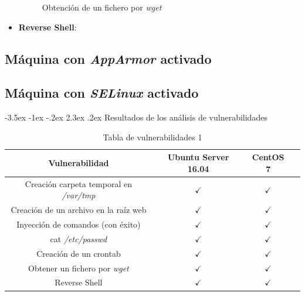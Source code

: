 \documentclass[11pt]{report}
\makeatletter
\renewcommand\chapter{\@startsection{chapter}{0}{\z@}%
    {-3.5ex \@plus -1ex \@minus -.2ex}%
    {2.3ex \@plus.2ex}%
    {\normalfont\Large\bfseries}}
\makeatother
\begin{document}
\begin{itemize}
\begin{figure}[H]
          \caption{Obtención de un fichero por \emph{wget}}
        \end{figure}
  \item \textbf{Reverse Shell}:
\end{itemize}
\subsection{Máquina con \emph{AppArmor} activado}
\subsection{Máquina con \emph{SELinux} activado}

\chapter{Resultados de los análisis de vulnerabilidades}
\begin{table}[H]
  \centering
  \begin{tabular}{|c|c|c|c|}
    \hline
    \textbf{Vulnerabilidad}                      & \textbf{Ubuntu Server 16.04} & \textbf{CentOS 7} \\ \hline
    Creación carpeta temporal en \emph{/var/tmp} & $\checkmark$                 & $\checkmark$      \\ \hline
    Creación de un archivo en la raíz web        & $\checkmark$                 & $\checkmark$      \\ \hline
    Inyección de comandos (con éxito)            & $\checkmark$                 & $\checkmark$      \\ \hline
    cat \emph{/etc/passwd}                       & $\checkmark$                 & $\checkmark$      \\ \hline
    Creación de un crontab                       & $\checkmark$                 & $\checkmark$      \\ \hline
    Obtener un fichero por \emph{wget}           & $\checkmark$                 & $\checkmark$      \\ \hline
    Reverse Shell                                & $\checkmark$                 & $\checkmark$      \\ \hline
  \end{tabular}
  \caption{Tabla de vulnerabilidades 1}
\end{table}
\end{document}
